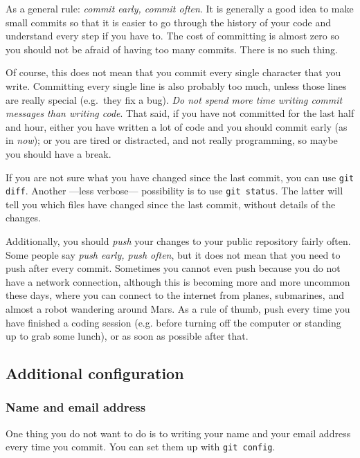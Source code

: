 As a general rule: \emph{commit early, commit often}. It is generally
a good idea to make small commits so that it is easier to go through
the history of your code and understand every step if you have to. The
cost of 
committing is almost zero so you should not be afraid of having too
many commits. There is no such thing. 

Of course, this does not mean that you commit every single character
that you write. Committing every single line is also probably too
much, unless those lines are really special (e.g.~they fix a bug). 
\emph{Do not spend more time
writing commit messages than writing code}. That said, if you have not
committed for the last half and hour, either you have written a lot of
code and you should commit early (as in \emph{now}); or you are tired
or distracted, and not really programming, so maybe you should have a
break.

If you are not sure what you have changed since the last commit, 
you can use \verb+git diff+. Another ---less verbose--- possibility
is to use \verb+git status+. The latter will tell you
which files have changed since the last commit, without details of the
changes.

Additionally, you should \emph{push} your changes to your public
repository fairly often. Some people say \emph{push early, push
  often}, but it does not mean that you need to push after every
commit. Sometimes 
you cannot even push because you do not have a network connection,
although this is becoming more and more uncommon these days, where you
can connect to the internet from planes, submarines, and almost a
robot wandering around Mars. As a rule of thumb, push every time you
have finished a coding session (e.g. before turning off the computer
or standing up to grab some lunch), or as soon as possible after that.

\subsection{Additional configuration}
\label{sec:addit-conf}

\subsubsection{Name and email address}
\label{sec:name-email-address}

One thing you do not want to do  is to writing your
name and your email address every time you commit. You can set them up
with \verb+git config+. 

